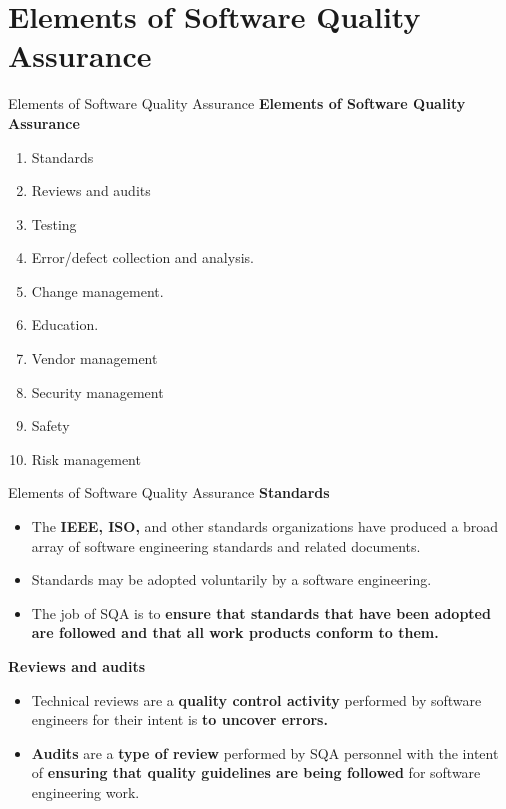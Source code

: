 \documentclass{beamer}
\begin{document}
\section{Elements of Software Quality Assurance}
\begin{frame}{Elements of Software Quality Assurance}
	\textbf{Elements of Software Quality Assurance}
	\begin{enumerate}
		\item Standards
		\item Reviews and audits
		\item Testing
		\item Error/defect collection and analysis.
		\item Change management.
		\item Education. 
		\item Vendor management
		\item Security management
		\item Safety
		\item Risk management
	\end{enumerate}
\end{frame}
\begin{frame}{Elements of Software Quality Assurance}
	\textbf{Standards}
	\begin{itemize}
		\item The\textbf{ IEEE, ISO,} and other standards organizations have produced a broad array of software engineering standards and related documents. 
		\item Standards may be adopted voluntarily by a software engineering. \item The job of SQA is to\textbf{ ensure that standards that have been adopted are followed and that all work products conform to them.}
	\end{itemize}
	\textbf{Reviews and audits}
\begin{itemize}
	\item Technical reviews are a \textbf{quality control activity} performed by software engineers for their intent is \textbf{to uncover errors.} 
	\item\textbf{Audits} are a\textbf{ type of review} performed by SQA personnel with the intent of \textbf{ensuring that quality guidelines are being followed} for software engineering work.
\end{itemize}
\end{frame}
\end{document}
